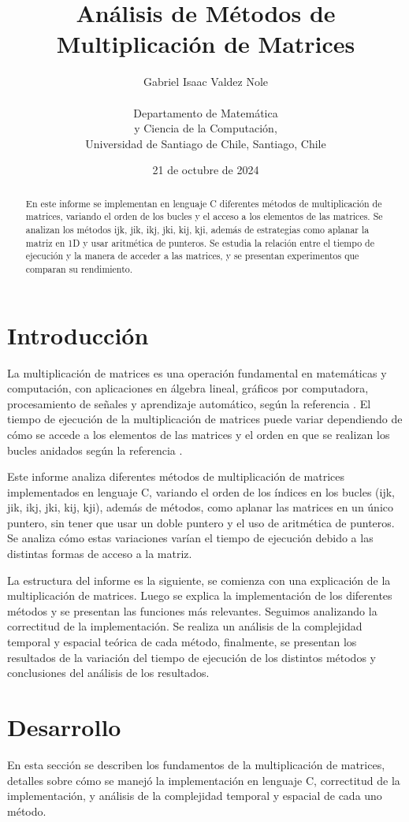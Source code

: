 \documentclass[10pt]{article}
\title{Análisis de Métodos de Multiplicación de Matrices}
\author{Gabriel Isaac Valdez Nole\\ \\ Departamento de Matemática \\ y Ciencia de la Computación, \\Universidad de Santiago de Chile, Santiago, Chile}
\date{21 de octubre de 2024}
\begin{document}
\maketitle

\begin{abstract}
En este informe se implementan en lenguaje C diferentes métodos de multiplicación de matrices, variando el orden de los bucles y el acceso a los elementos de las matrices. Se analizan los métodos ijk, jik, ikj, jki, kij, kji, además de estrategias como aplanar la matriz en 1D y usar aritmética de punteros. Se estudia la relación entre el tiempo de ejecución y la manera de acceder a las matrices, y se presentan experimentos que comparan su rendimiento.
\end{abstract}

\section{Introducción}
La multiplicación de matrices es una operación fundamental en matemáticas y computación, con aplicaciones en álgebra lineal, gráficos por computadora, procesamiento de señales y aprendizaje automático, según la referencia \cite{Strang2016}. El tiempo de ejecución de la multiplicación de matrices puede variar dependiendo de cómo se accede a los elementos de las matrices y el orden en que se realizan los bucles anidados según la referencia \cite{Goto2008}.

Este informe analiza diferentes métodos de multiplicación de matrices implementados en lenguaje C, variando el orden de los índices en los bucles (ijk, jik, ikj, jki, kij, kji), además de métodos, como aplanar las matrices en un único puntero, sin tener que usar un doble puntero y el uso de aritmética de punteros. Se analiza cómo estas variaciones varían el tiempo de ejecución debido a las distintas formas de acceso a la matriz.

La estructura del informe es la siguiente, se comienza con una explicación de la multiplicación de matrices. Luego se explica la implementación de los diferentes métodos y se presentan las funciones más relevantes. Seguimos analizando la correctitud de la implementación. Se realiza un análisis de la complejidad temporal y espacial teórica de cada método, finalmente, se presentan los resultados de la variación del tiempo de ejecución de los distintos métodos y conclusiones del análisis de los resultados.

\section{Desarrollo}
En esta sección se describen los fundamentos de la multiplicación de matrices, detalles sobre cómo se manejó la implementación en lenguaje C, correctitud de la implementación, y análisis de la complejidad temporal y espacial de cada uno método.
\end{document}
